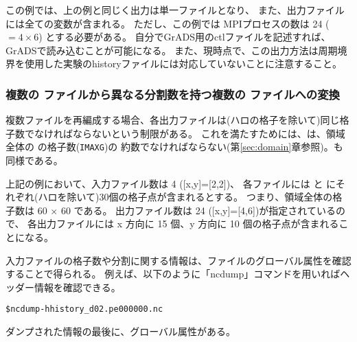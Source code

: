 この例では、上の例と同じく出力は単一ファイルとなり、
また、出力ファイルには全ての変数が含まれる。
ただし、この例では MPIプロセスの数は 24 ($=4\times6$) とする必要がある。
自分でGrADS用のctlファイルを記述すれば、GrADSで読み込むことが可能になる。
また、現時点で、この出力方法は周期境界を使用した実験のhistoryファイルには対応していないことに注意すること。


\subsubsection{複数の \scalenetcdf ファイルから異なる分割数を持つ複数の \scalenetcdf ファイルへの変換}
%

複数ファイルを再編成する場合、各出力ファイルは(ハロの格子を除いて)同じ格子数でなければならないという制限がある。
これを満たすためには、は、領域全体の{\XDIR} の格子数(\verb|IMAXG|)の
約数でなければならない(第\ref{sec:domain}章参照)。も同様である。

上記の例において、入力ファイル数は 4 ([x,y]=[2,2])、
各ファイルには{\XDIR} と {\YDIR}にそれぞれ(ハロを除いて)30個の格子点が含まれるとする。
つまり、領域全体の格子数は 60 $\times$ 60 である。
%
出力ファイル数は 24 ([x,y]=[4,6])が指定されているので、
各出力ファイルには x 方向に 15 個、y 方向に 10 個の格子点が含まれることになる。


入力ファイルの格子数や分割に関する情報は、\scalenetcdf ファイルのグローバル属性を確認することで得られる。
例えば、以下のように「ncdump」コマンドを用いればヘッダー情報を確認できる。

\begin{alltt}
  \$  ncdump -h history_d02.pe000000.nc
\end{alltt}

ダンプされた情報の最後に、グローバル属性がある。

